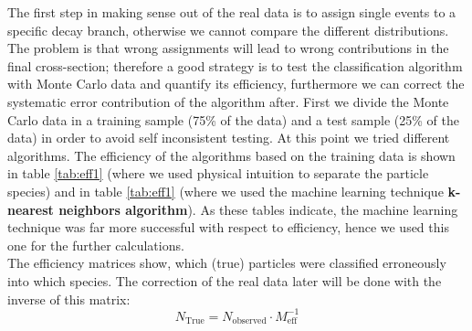 The first step in making sense out of the real data is to assign single events to a specific decay branch, otherwise
we cannot compare the different distributions. The problem is that wrong assignments will lead to wrong contributions 
in the final cross-section; therefore a good strategy is to test the classification algorithm with Monte Carlo data and 
quantify its efficiency, furthermore we can correct the systematic error contribution of the algorithm after. First we 
divide the Monte Carlo data in a training sample (75\% of the data) and a test sample (25\% of the data) in order to avoid
self inconsistent testing.  At this point we tried different algorithms. The efficiency of the algorithms based on the training
data is shown in table \ref{tab:eff1} (where we used physical intuition to separate the particle species) and in table
\ref{tab:eff1} (where we used the machine learning technique \textbf{k-nearest neighbors algorithm}). As these tables indicate,
the machine learning technique was far more successful with respect to efficiency, hence we used this one for the further 
calculations. \\
The efficiency matrices show, which (true) particles were classified erroneously into which species. The correction
of the real data later will be done with the inverse of this matrix:
\begin{equation}
    N_{\mathrm{True}} = N_{ \mathrm{observed}} \cdot M_{\mathrm{eff}}^{-1}
\end{equation}


